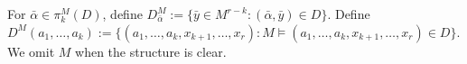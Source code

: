 \documentclass[12pt]{article}
\newtheorem{lem}[thm]{Lemma}
\theoremstyle{definition}
\newtheorem{defi}[thm]{Definition}
\theoremstyle{mystyle}
\theoremstyle{remark}
\newcommand{\LC}{\mathcal{L}}
\newcommand{\Li}{\mathcal{L}^{(i)}_{\text{ring}}}
\newcommand{\clos}[2]{#1^{(#2)}}
\begin{document}
For $\bar{\alpha} \in \pi_k^M(D)$, define
$D^M_{\bar{\alpha}}:=\{\bar{y} \in M^{r-k}: (\bar{\alpha}, \bar{y}) \in D\}.$
Define $D^M(a_1, \ldots, a_k):= \{(a_1, \ldots, a_k, x_{k+1},
\ldots, x_r): M \models (a_1, \ldots, a_k, x_{k+1}, \ldots, x_r)
\in D\}$.
We omit $M$ when the structure is clear.
%
%
%
%
%
%
%
\end{document}
